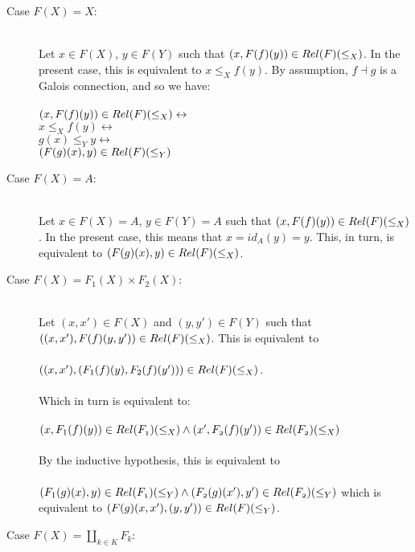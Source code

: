 \documentclass{article}
\begin{document}
\begin{description}

\item[Case $F(X) = X$:]~\\

Let $x \in F(X)$, $y \in F(Y)$ such that $(x,F(f)(y)) \in \mit{Rel}(F)(\leq_X)$.
In the present case, this is equivalent to $x \leq_X f(y)$. By assumption, $f \dashv g$ is a Galois connection, 
and so we have:\\~\\
$(x,F(f)(y)) \in \mit{Rel}(F)(\leq_X) \leftrightarrow$\\ 
$x \leq_X f(y) \leftrightarrow$\\ 
$g(x) \leq_Y y \leftrightarrow$\\
$(F(g)(x), y) \in \mit{Rel}(F)(\leq_Y)$ 

\item[Case $F(X) = A$:]~\\

Let $x \in F(X) = A$, $y \in F(Y) = A$ such that $(x,F(f)(y)) \in \mit{Rel}(F)(\leq_X)$.
In the present case, this means that $x = id_A(y) = y$. This, in turn, is equivalent to $(F(g)(x),y) \in \mit{Rel}(F)(\leq_X)$.

\item[Case $F(X) = F_1(X) \times F_2(X)$:]~\\

Let $(x,x') \in F(X)$ and $(y,y') \in F(Y)$ such that $((x,x'),F(f)(y,y')) \in \mit{Rel}(F)(\leq_X)$.
This is equivalent to \\~\\
$((x,x'),(F_1(f)(y),F_2(f)(y'))) \in \mit{Rel}(F)(\leq_X)$. \\~\\ 
Which in turn is equivalent to:\\~\\
$(x,F_1(f)(y)) \in \mit{Rel}(F_1)(\leq_X) \wedge (x', F_2(f)(y')) \in \mit{Rel}(F_2)(\leq_X)$\\~\\
By the inductive hypothesis, this is equivalent to\\~\\
$(F_1(g)(x),y) \in \mit{Rel}(F_1)(\leq_Y) \wedge (F_2(g)(x'), y') \in \mit{Rel}(F_2)(\leq_Y)$
which is equivalent to
$(F(g)(x,x'), (y,y')) \in \mit{Rel}(F)(\leq_Y)$.

\item[Case $F(X) = \coprod_{k \in K} F_k$:]~\\


\end{description}
\end{document}
